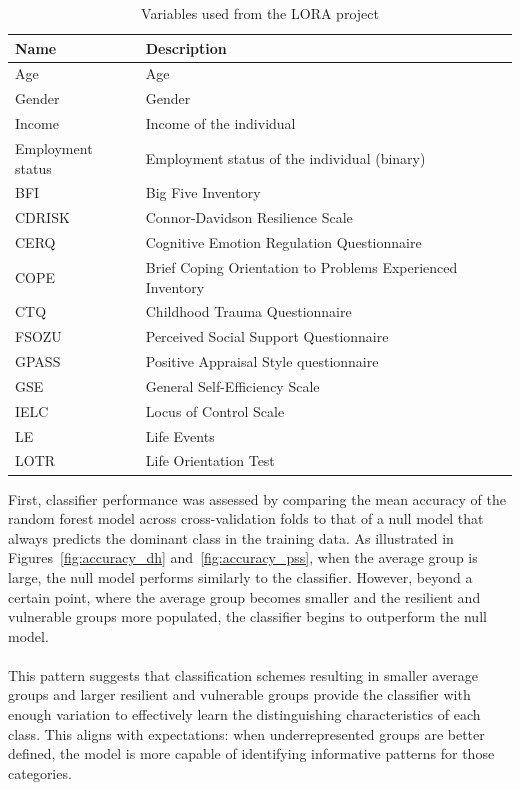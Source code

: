\documentclass[12pt]{article}
\begin{document}
\begin{table}[H]
\centering
{}
{\small
\begin{tabular}{>{\centering\arraybackslash}p{3.5cm}
>{\centering\arraybackslash}p{12cm}}
\hline
\textbf{Name} & \textbf{Description}\\
\hline
Age & Age\\
Gender & Gender\\
Income  & Income of the individual\\
Employment status  & Employment status of the individual (binary)\\
BFI  & Big Five Inventory \\
CDRISK  & Connor-Davidson Resilience Scale\\
CERQ  & Cognitive Emotion Regulation Questionnaire\\
COPE  & Brief Coping Orientation to Problems Experienced Inventory \\
CTQ  & Childhood Trauma Questionnaire\\
FSOZU  & Perceived Social Support Questionnaire\\
GPASS & Positive Appraisal Style questionnaire\\
GSE  & General Self-Efficiency Scale\\
IELC  & Locus of Control Scale\\
LE & Life Events\\
LOTR & Life Orientation Test\\
\hline
\end{tabular}
}
\caption{Variables used from the LORA project}
\label{table:variables_lora}
\end{table}
First, classifier performance was assessed by comparing the mean accuracy of the random forest model across cross-validation folds to that of a null model that always predicts the dominant class in the training data. As illustrated in Figures~\ref{fig:accuracy_dh} and~\ref{fig:accuracy_pss}, when the average group is large, the null model performs similarly to the classifier. However, beyond a certain point, where the average group becomes smaller and the resilient and vulnerable groups more populated, the classifier begins to outperform the null model.\\
\\
This pattern suggests that classification schemes resulting in smaller average groups and larger resilient and vulnerable groups provide the classifier with enough variation to effectively learn the distinguishing characteristics of each class. This aligns with expectations: when underrepresented groups are better defined, the model is more capable of identifying informative patterns for those categories.
\end{document}
